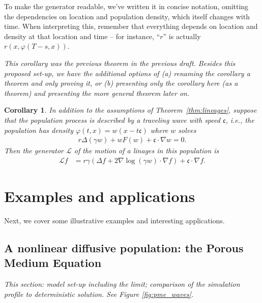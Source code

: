 \documentclass[12pt]{article}
\newtheorem{corollary}[theorem]{Corollary}
\newcommand{\grad}{\nabla}
\newcommand{\wavespeed}{\mathfrak{c}}    %
\newcommand{\Lgen}{\mathcal{L}}    %
\newcommand{\comment}[1]{{\color{blue} \it #1}}
\begin{document}
To make the generator readable, we've written it in concise notation,
omitting the dependencies on location and population density,
which itself changes with time.
When interpreting this,
remember that everything depends on location and density at that location and time --
for instance, ``$r$'' is actually $r(x, \varphi(T-s, x))$.

\comment{This corollary was the previous theorem in the previous draft.
    Besides this proposed set-up, we have the additional options of
    (a) renaming the corollary a theorem and only proving it,
    or (b) presenting only the corollary here (as a theorem)
    and presenting the more general theorem later on.
}

\begin{corollary} \label{cor:wavefront}
    In addition to the assumptions of Theorem~\ref{thm:lineages},
    suppose that the population process is described by a traveling wave with speed $\wavespeed$,
    i.e., the population has density
    $\varphi(t, x) = w(x - t \wavespeed)$
    where $w$ solves
    \begin{align*}
        r \Delta (\gamma w) + w F(w) + \wavespeed \cdot \grad w = 0 .
    \end{align*}
    Then the generator $\Lgen$
    of the motion of a linages in this population is
    \begin{align}
        \Lgen f
        &=
        r \gamma
        \left(
            \Delta f
            +
            2 \grad \log (\gamma w)
            \cdot \grad f
        \right)
        + \wavespeed \cdot \grad f .
    \end{align}
\end{corollary}


\section{Examples and applications}

Next,
we cover some illustrative examples
and interesting applications.

\subsection{A nonlinear diffusive population: the Porous Medium Equation}

\comment{
    This section:
    model set-up including the limit;
    comparison of the simulation profile to deterministic solution.
    See Figure \ref{fig:pme_waves}.
}
\end{document}
